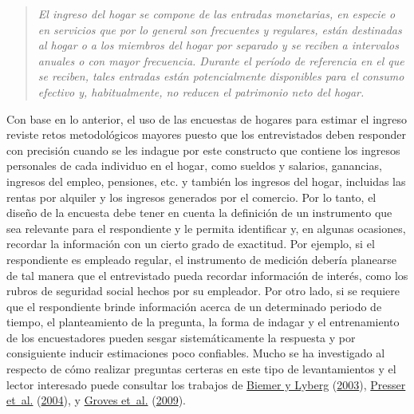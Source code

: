 \documentclass[
  12pt,
  spanish,
]{book}
\begin{document}
\begin{quote}
\emph{El ingreso del hogar se compone de las entradas monetarias, en especie o en servicios que por lo general son frecuentes y regulares, están destinadas al hogar o a los miembros del hogar por separado y se reciben a intervalos anuales o con mayor frecuencia. Durante el período de referencia en el que se reciben, tales entradas están potencialmente disponibles para el consumo efectivo y, habitualmente, no reducen el patrimonio neto del hogar.}
\end{quote}

Con base en lo anterior, el uso de las encuestas de hogares para estimar el ingreso reviste retos metodológicos mayores puesto que los entrevistados deben responder con precisión cuando se les indague por este constructo que contiene los ingresos personales de cada individuo en el hogar, como sueldos y salarios, ganancias, ingresos del empleo, pensiones, etc. y también los ingresos del hogar, incluidas las rentas por alquiler y los ingresos generados por el comercio. Por lo tanto, el diseño de la encuesta debe tener en cuenta la definición de un instrumento que sea relevante para el respondiente y le permita identificar y, en algunas ocasiones, recordar la información con un cierto grado de exactitud. Por ejemplo, si el respondiente es empleado regular, el instrumento de medición debería planearse de tal manera que el entrevistado pueda recordar información de interés, como los rubros de seguridad social hechos por su empleador. Por otro lado, si se requiere que el respondiente brinde información acerca de un determinado periodo de tiempo, el planteamiento de la pregunta, la forma de indagar y el entrenamiento de los encuestadores pueden sesgar sistemáticamente la respuesta y por consiguiente inducir estimaciones poco confiables. Mucho se ha investigado al respecto de cómo realizar preguntas certeras en este tipo de levantamientos y el lector interesado puede consultar los trabajos de \protect\hyperlink{ref-Biemer_Lyberg_2003}{Biemer y Lyberg} (\protect\hyperlink{ref-Biemer_Lyberg_2003}{2003}), \protect\hyperlink{ref-Presser_Rothgeb_Couper_Lessler_Martin_Martin_Singer_2004}{Presser et~al.} (\protect\hyperlink{ref-Presser_Rothgeb_Couper_Lessler_Martin_Martin_Singer_2004}{2004}), y \protect\hyperlink{ref-Groves_Fowler_Couper_Lepkowski_Singer_Tourangeau_2009}{Groves et~al.} (\protect\hyperlink{ref-Groves_Fowler_Couper_Lepkowski_Singer_Tourangeau_2009}{2009}).
\end{document}
